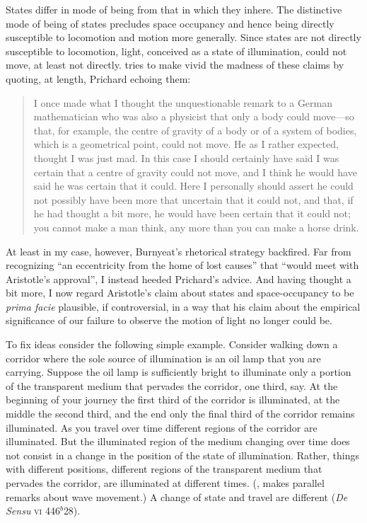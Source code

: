 States differ in mode of being from that in which they inhere. The distinctive mode of being of states precludes space occupancy and hence being directly susceptible to locomotion and motion more generally. Since states are not directly susceptible to locomotion, light, conceived as a state of illumination, could not move, at least not directly. \citet[430 n29; appendix]{Burnyeat:1995fk} tries to make vivid the madness of these claims by quoting, at length, Prichard echoing them:
\begin{quote}
	I once made what I thought the unquestionable remark to a German mathematician who was also a physicist that only a body could move---so that, for example, the centre of gravity of a body or of a system of bodies, which is a geometrical point, could not move. He as I rather expected, thought I was just mad. In this case I should certainly have said I was certain that a centre of gravity could not move, and I think he would have said he was certain that it could. Here I personally should assert he could not possibly have been more that uncertain that it could not, and that, if he had thought a bit more, he would have been certain that it could not; you cannot make a man think, any more than you can make a horse drink. \citep[99; this is just the initial paragraph of the material that Burnyeat quotes]{Prichard:1950tg}
\end{quote}
At least in my case, however, Burnyeat's \citeyearpar[430 n29]{Burnyeat:1995fk} rhetorical strategy backfired. Far from recognizing ``an eccentricity from the home of lost causes'' that ``would meet with Aristotle's approval'', I instead heeded Prichard's advice. And having thought a bit more, I now regard Aristotle's claim about states and space-occupancy to be \emph{prima facie} plausible, if controversial, in a way that his claim about the empirical significance of our failure to observe the motion of light no longer could be.

To fix ideas consider the following simple example. Consider walking down a corridor where the sole source of illumination is an oil lamp that you are carrying. Suppose the oil lamp is sufficiently bright to illuminate only a portion of the transparent medium that pervades the corridor, one third, say. At the beginning of your journey the first third of the corridor is illuminated, at the middle the second third, and the end only the final third of the corridor remains illuminated. As you travel over time different regions of the corridor are illuminated. But the illuminated region of the medium changing over time does not consist in a change in the position of the state of illumination. Rather, things with different positions, different regions of the transparent medium that pervades the corridor, are illuminated at different times. (\citealt[99]{Prichard:1950tg}, makes parallel remarks about wave movement.) A change of state and travel are different (\emph{De Sensu} \textsc{vi} 446\( ^{b} \)28).

